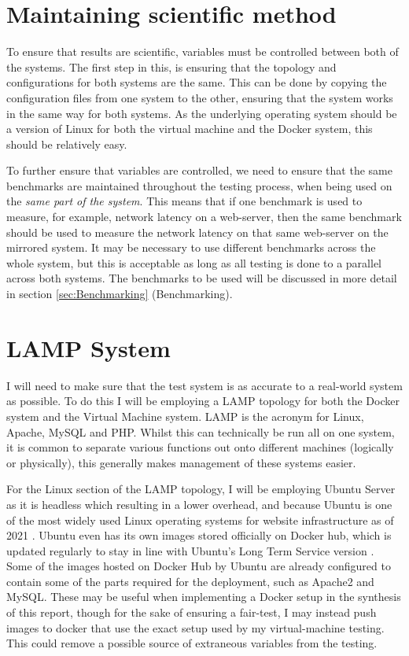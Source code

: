 \section{Maintaining scientific method}
To ensure that results are scientific, variables must be controlled between both of the systems. The first step in this, is ensuring that the topology and configurations for both systems are the same. This can be done by copying the configuration files from one system to the other, ensuring that the system works in the same way for both systems. As the underlying operating system should be a version of Linux for both the virtual machine and the Docker system, this should be relatively easy.

To further ensure that variables are controlled, we need to ensure that the same benchmarks are maintained throughout the testing process, when being used on the \emph{same part of the system}. This means that if one benchmark is used to measure, for example, network latency on a web-server, then the same benchmark should be used to measure the network latency on that same web-server on the mirrored system. It may be necessary to use different benchmarks across the whole system, but this is acceptable as long as all testing is done to a parallel across both systems. The benchmarks to be used will be discussed in more detail in section \ref{sec:Benchmarking} (Benchmarking).


\section{LAMP System}
\label{sec:LAMPsystem}
I will need to make sure that the test system is as accurate to a real-world system as possible. To do this I will be employing a LAMP topology for both the Docker system and the Virtual Machine system. LAMP is the acronym for Linux, Apache, MySQL and PHP. Whilst this can technically be run all on one system, it is common to separate various functions out onto different machines (logically or physically), this generally makes management of these systems easier.

For the Linux section of the LAMP topology, I will be employing Ubuntu Server as it is headless which resulting in a lower overhead, and because Ubuntu is one of the most widely used Linux operating systems for website infrastructure as of 2021 \citep{w3techUbuntu}. Ubuntu even has its own images stored officially on Docker hub, which is updated regularly to stay in line with Ubuntu's Long Term Service version \citep{ubuntuDocker}. Some of the images hosted on Docker Hub by Ubuntu \citep{ubuntuDockerProfile} are already configured to contain some of the parts required for the deployment, such as Apache2 and MySQL. These may be useful when implementing a Docker setup in the synthesis of this report, though for the sake of ensuring a fair-test, I may instead push images to docker that use the exact setup used by my virtual-machine testing. This could remove a possible source of extraneous variables from the testing.

